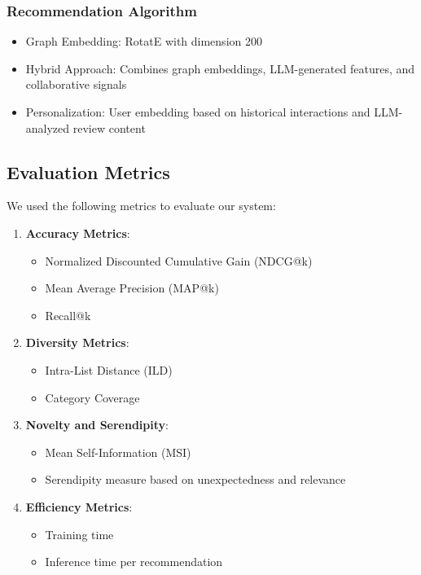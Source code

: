 \documentclass{article}
\begin{document}
\subsubsection{Recommendation Algorithm}
\begin{itemize}
    \item Graph Embedding: RotatE with dimension 200
    \item Hybrid Approach: Combines graph embeddings, LLM-generated features, and collaborative signals
    \item Personalization: User embedding based on historical interactions and LLM-analyzed review content
\end{itemize}

\subsection{Evaluation Metrics}

We used the following metrics to evaluate our system:

\begin{enumerate}
    \item \textbf{Accuracy Metrics}:
    \begin{itemize}
        \item Normalized Discounted Cumulative Gain (NDCG@k)
        \item Mean Average Precision (MAP@k)
        \item Recall@k
    \end{itemize}
    
    \item \textbf{Diversity Metrics}:
    \begin{itemize}
        \item Intra-List Distance (ILD)
        \item Category Coverage
    \end{itemize}
    
    \item \textbf{Novelty and Serendipity}:
    \begin{itemize}
        \item Mean Self-Information (MSI)
        \item Serendipity measure based on unexpectedness and relevance
    \end{itemize}
    
    \item \textbf{Efficiency Metrics}:
    \begin{itemize}
        \item Training time
        \item Inference time per recommendation
    \end{itemize}
\end{enumerate}
\end{document}
